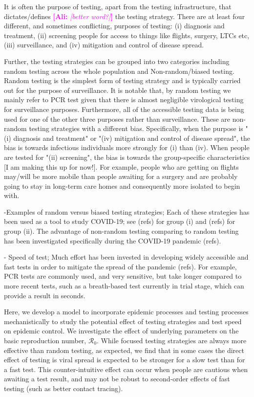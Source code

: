 \documentclass[12pt]{article}
\newcommand{\comment}{\showcomment}
\newcommand{\showcomment}[3]{\textcolor{#1}{\textbf{[#2: }\textsl{#3}\textbf{]}}}
\newcommand{\ali}[1]{\comment{magenta}{Ali}{#1}}
\newcommand{\Rnum}{\mathcal{R}_0}
\theoremstyle{definition} %
\begin{document}
It is often the purpose of testing, apart from the testing infrastructure, that dictates/defines \ali{[better word?]} the testing strategy. There are at least four different, and sometimes conflicting, purposes of testing: (i) diagnosis and treatment, (ii) screening people for access to things like flights, surgery, LTCs etc, (iii) surveillance, and (iv) mitigation and control of disease spread.
  
Further, the testing strategies can be grouped into two categories including random testing across the whole population and Non-random/biased testing. Random testing is the simplest form of testing strategy and is typically carried out for the purpose of surveillance. It is notable that, by random testing we mainly refer to PCR test given that there is almost negligible virological testing for surveillance purposes. Furthermore, all of the accessible testing data is being used for one of the other three purposes rather than surveillance. These are non-random testing strategies with a different bias. Specifically, when the purpose is "(i) diagnosis and treatment" or "(iv) mitigation and control of disease spread", the bias is towards infectious individuals more strongly for (i) than (iv). When people are tested for "(ii) screening", the bias is towards the group-specific characteristics [I am making this up for now!]. For example, people who are getting on flights may/will be more mobile than people awaiting for a surgery and are probably going to stay in long-term care homes and consequently more isolated to begin with.    


-Examples of random versus biased testing strategies;
Each of these strategies has been used as a tool to study COVID-19; see (refs) for group (i) and (refs) for group (ii). The advantage of non-random testing comparing to random testing has been investigated specifically during the COVID-19 pandemic (refs). 

- Speed of test; 
Much effort has been invested in developing widely accessible and fast tests in order to mitigate the spread of the pandemic (refs). For example, PCR tests are commonly used, and very sensitive, but take longer compared to more recent tests, such as a breath-based test currently in trial stage, which can provide a result in seconds.

Here, we develop a model to incorporate epidemic processes and testing processes mechanistically to study the potential effect of testing strategies and test speed on epidemic control. We investigate the effect of underlying parameters on the basic reproduction number, $\Rnum$. While focused testing strategies are always more effective than random testing, as expected, we find that in some cases the direct effect of testing is viral spread is expected to be stronger for a slow test than for a fast test. This counter-intuitive effect can occur when people are cautious when awaiting a test result, and may not be robust to second-order effects of fast testing (such as better contact tracing). 
\end{document}

